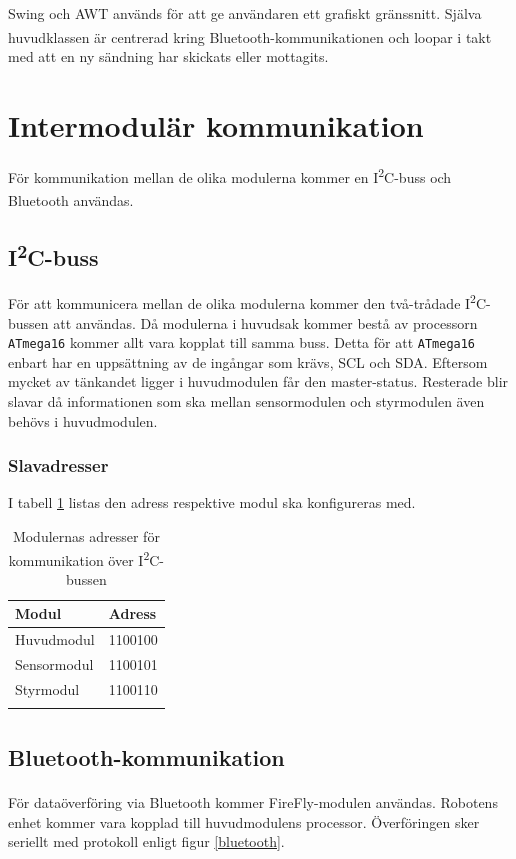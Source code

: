 \documentclass[11pt]{article}
\begin{document}
\begin{flushleft}
Swing och AWT används för att ge användaren ett grafiskt gränssnitt. Själva huvudklassen är centrerad kring Bluetooth\textsuperscript{\circledR}-kommunikationen och loopar i takt med att en ny sändning har skickats eller mottagits. 

\pagebreak
\section{Intermodulär kommunikation}\label{Intermodulär kommunikation}
För kommunikation mellan de olika modulerna kommer en I\textsuperscript{2}C-buss och Bluetooth\textsuperscript{\circledR} användas. 

\subsection{I\textsuperscript{2}C-buss}

För att kommunicera mellan de olika modulerna kommer den två-trådade I\textsuperscript{2}C-bussen att användas. Då modulerna i huvudsak kommer bestå av processorn \verb+ATmega16+ kommer allt vara kopplat till samma buss. Detta för att \verb+ATmega16+ enbart har en uppsättning av de ingångar som krävs, SCL och SDA. Eftersom mycket av tänkandet ligger i huvudmodulen får den master-status. Resterade blir slavar då informationen som ska mellan sensormodulen och styrmodulen även behövs i huvudmodulen.

\subsubsection{Slavadresser}
I tabell \ref{slavAdress} listas den adress respektive modul ska konfigureras med. 

\begin{center}
\begin{longtable}{|l|l|} \hline
\textbf{Modul} & \textbf{Adress}\\ \hline 
Huvudmodul & 1100100 \\ \hline
Sensormodul & 1100101 \\ \hline
Styrmodul & 1100110\\ \hline
\caption{Modulernas adresser för kommunikation över I\textsuperscript{2}C-bussen}
\label{slavAdress}
\end{longtable}
\end{center}


\subsection{Bluetooth\textsuperscript{\circledR}-kommunikation}
För dataöverföring via Bluetooth\textsuperscript{\circledR} kommer FireFly-modulen användas. Robotens enhet kommer vara kopplad till huvudmodulens processor. Överföringen sker seriellt med protokoll enligt figur \ref{bluetooth}.


\end{flushleft}
\end{document}
